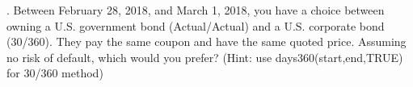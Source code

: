 \documentclass[11.5pt]{article}
\begin{document}



\vspace{80pt}



. Between February 28, 2018, and March 1, 2018, you have a choice between owning a U.S. government bond (Actual/Actual) and a U.S. corporate bond (30/360). They pay the same coupon and have the same quoted price. Assuming no risk of default, which would you prefer? (Hint: use days360(start,end,TRUE) for 30/360 method)

\end{document}
